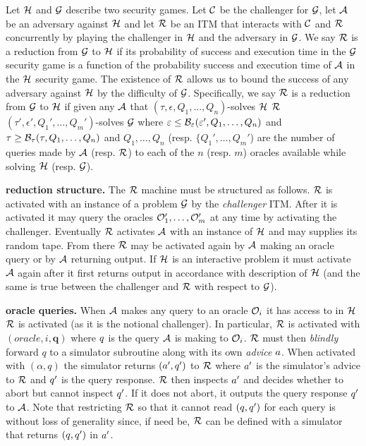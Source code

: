 \begin{definition}
  \label{security-reduction}


  Let $\mathcal{H}$ and $\mathcal{G}$ describe two security games.
  Let $\mathcal{C}$ be the challenger for $\mathcal{G}$, let $\mathcal{A}$ be an adversary against $\mathcal{H}$ and let $\mathcal{R}$ be an ITM that interacts with $\mathcal{C}$ and $\mathcal{R}$ concurrently by playing the challenger in $\mathcal{H}$ and the adversary in $\mathcal{G}$.
  We say $\mathcal{R}$ is a reduction from $\mathcal{G}$ to $\mathcal{H}$ if its probability of success and execution time in the $\mathcal{G}$ security game is a function of the probability success and execution time of $\mathcal{A}$ in the $\mathcal{H}$ security game.
  The existence of $\mathcal{R}$ allows us to bound the success of any adversary against $\mathcal{H}$ by the difficulty of $\mathcal{G}$.
  Specifically, we say $\mathcal{R}$ is a reduction from $\mathcal{G}$ to $\mathcal{H}$ if given any $\mathcal{A}$ that $(\tau, \epsilon, Q_1,...,Q_n)$-solves $\mathcal{H}$ $\mathcal{R}$ $(\tau', \epsilon', Q_1',\dots,Q_m')$-solves $\mathcal{G}$ where $\varepsilon \leq \mathcal{B}_\varepsilon(\varepsilon', Q_1,\dots,Q_n) $ and $\tau \geq \mathcal{B}_\tau(\tau, Q_1,\dots,Q_n)$ and $Q_1,\dots,Q_n$ (resp. $\{Q_1', \dots, Q_m'$) are the number of queries made by $\mathcal{A}$ (resp. $\mathcal{R}$) to each of the $n$ (resp. $m$) oracles available while solving $\mathcal{H}$ (resp. $\mathcal{G}$).

  \textbf{reduction structure.} The $\mathcal{R}$ machine must be structured as follows.
  $\mathcal{R}$ is activated with an instance of a problem $\mathcal{G}$ by the \emph{challenger} ITM.
  After it is activated it may query the oracles $\mathcal{O}_1',\dots,\mathcal{O}_m'$ at any time by activating the challenger.
  Eventually $\mathcal{R}$ activates $\mathcal{A}$ with an instance of $\mathcal{H}$ and may supplies its random tape.
  From there $\mathcal{R}$ may be activated again by $\mathcal{A}$ making an oracle query or by $\mathcal{A}$ returning output.
  If $\mathcal{H}$ is an interactive problem it must activate $\mathcal{A}$ again after it first returns output in accordance with description of $\mathcal{H}$ (and the same is true between the challenger and $\mathcal{R}$ with respect to $\mathcal{G}$).

  \textbf{oracle queries.} When $\mathcal{A}$ makes any query to an oracle $\mathcal{O}_i$ it has access to in $\mathcal{H}$ $\mathcal{R}$ is activated (as it is the notional challenger).
  In particular, $\mathcal{R}$ is activated with $(\mathit{oracle}, i,\mathbf{q})$ where $q$ is the query $\mathcal{A}$ is making to $\mathcal{O}_i$.
  $\mathcal{R}$ must then \emph{blindly} forward $q$ to a simulator subroutine along with its own \emph{advice} $a$.
  When activated with $(\alpha, q)$ the simulator returns $(a', q')$ to $\mathcal{R}$ where $a'$ is the simulator's advice to $\mathcal{R}$ and $q'$ is the query response.
  $\mathcal{R}$ then inspects $a'$ and decides whether to abort but cannot inspect $q'$.
  If it does not abort, it outputs the query response $q'$ to $\mathcal{A}$.
  Note that restricting $\mathcal{R}$ so that it cannot read $(q, q')$ for each query is without loss of generality since, if need be, $\mathcal{R}$ can be defined with a simulator that returns $(q,q')$ in $a'$.


\end{definition}
